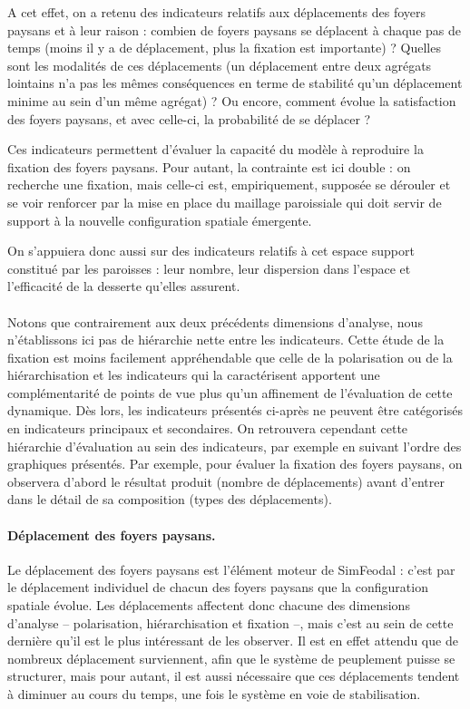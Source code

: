 A cet effet, on a retenu des indicateurs relatifs aux déplacements des foyers paysans et à leur raison :
combien de foyers paysans se déplacent à chaque pas de temps (moins il y a de déplacement, plus la fixation est importante) ? Quelles sont les modalités de ces déplacements (un déplacement entre deux agrégats lointains n'a pas les mêmes conséquences en terme de stabilité qu'un déplacement minime au sein d'un même agrégat) ? Ou encore, comment évolue la satisfaction des foyers paysans, et avec celle-ci, la probabilité de se déplacer ?

Ces indicateurs permettent d'évaluer la capacité du modèle à reproduire la fixation des foyers paysans.
Pour autant, la contrainte est ici double :
on recherche une fixation, mais celle-ci est, empiriquement, supposée se dérouler et se voir renforcer par la mise en place du maillage paroissiale qui doit servir de support à la nouvelle configuration spatiale émergente.

On s'appuiera donc aussi sur des indicateurs relatifs à cet espace support constitué par les paroisses :
leur nombre, leur dispersion dans l'espace et l'efficacité de la desserte qu'elles assurent.

\paragraph*{}Notons que contrairement aux deux précédents dimensions d'analyse, nous n'établissons ici pas de hiérarchie nette entre les indicateurs.
Cette étude de la fixation est moins facilement appréhendable que celle de la polarisation ou de la hiérarchisation et les indicateurs qui la caractérisent apportent une complémentarité de points de vue plus qu'un affinement de l'évaluation de cette dynamique.
Dès lors, les indicateurs présentés ci-après ne peuvent être catégorisés en indicateurs principaux et secondaires.
On retrouvera cependant cette hiérarchie d'évaluation au sein des indicateurs, par exemple en suivant l'ordre des graphiques présentés.
Par exemple, pour évaluer la fixation des foyers paysans, on observera d'abord le résultat produit (nombre de déplacements) avant d'entrer dans le détail de sa composition (types des déplacements).

\paragraph{Déplacement des foyers paysans.}

Le déplacement des foyers paysans est l'élément moteur de SimFeodal :
c'est par le déplacement individuel de chacun des foyers paysans que la configuration spatiale évolue.
Les déplacements affectent donc chacune des dimensions d'analyse -- polarisation, hiérarchisation et fixation --, mais c'est au sein de cette dernière qu'il est le plus intéressant de les observer.
Il est en effet attendu que de nombreux déplacement surviennent, afin que le système de peuplement puisse se structurer, mais pour autant, il est aussi nécessaire que ces déplacements tendent à diminuer au cours du temps, une fois le système en voie de stabilisation.

